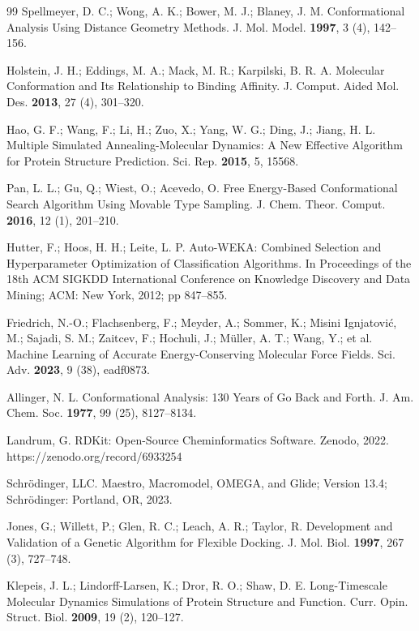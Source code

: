 \documentclass[12pt]{article}
\begin{document}
\begin{thebibliography}{99}
 Spellmeyer, D. C.; Wong, A. K.; Bower, M. J.; Blaney, J. M. Conformational Analysis Using Distance Geometry Methods. J. Mol. Model. \textbf{1997}, 3 (4), 142--156.

 Holstein, J. H.; Eddings, M. A.; Mack, M. R.; Karpilski, B. R. A. Molecular Conformation and Its Relationship to Binding Affinity. J. Comput. Aided Mol. Des. \textbf{2013}, 27 (4), 301--320.

 Hao, G. F.; Wang, F.; Li, H.; Zuo, X.; Yang, W. G.; Ding, J.; Jiang, H. L. Multiple Simulated Annealing-Molecular Dynamics: A New Effective Algorithm for Protein Structure Prediction. Sci. Rep. \textbf{2015}, 5, 15568.

 Pan, L. L.; Gu, Q.; Wiest, O.; Acevedo, O. Free Energy-Based Conformational Search Algorithm Using Movable Type Sampling. J. Chem. Theor. Comput. \textbf{2016}, 12 (1), 201--210.

 Hutter, F.; Hoos, H. H.; Leite, L. P. Auto-WEKA: Combined Selection and Hyperparameter Optimization of Classification Algorithms. In Proceedings of the 18th ACM SIGKDD International Conference on Knowledge Discovery and Data Mining; ACM: New York, 2012; pp 847--855.

 Friedrich, N.-O.; Flachsenberg, F.; Meyder, A.; Sommer, K.; Misini Ignjatović, M.; Sajadi, S. M.; Zaitcev, F.; Hochuli, J.; Müller, A. T.; Wang, Y.; et al. Machine Learning of Accurate Energy-Conserving Molecular Force Fields. Sci. Adv. \textbf{2023}, 9 (38), eadf0873.

 Allinger, N. L. Conformational Analysis: 130 Years of Go Back and Forth. J. Am. Chem. Soc. \textbf{1977}, 99 (25), 8127--8134.

 Landrum, G. RDKit: Open-Source Cheminformatics Software. Zenodo, 2022. https://zenodo.org/record/6933254

 Schrödinger, LLC. Maestro, Macromodel, OMEGA, and Glide; Version 13.4; Schrödinger: Portland, OR, 2023.

 Jones, G.; Willett, P.; Glen, R. C.; Leach, A. R.; Taylor, R. Development and Validation of a Genetic Algorithm for Flexible Docking. J. Mol. Biol. \textbf{1997}, 267 (3), 727--748.

 Klepeis, J. L.; Lindorff-Larsen, K.; Dror, R. O.; Shaw, D. E. Long-Timescale Molecular Dynamics Simulations of Protein Structure and Function. Curr. Opin. Struct. Biol. \textbf{2009}, 19 (2), 120--127.


\end{thebibliography}
\end{document}
